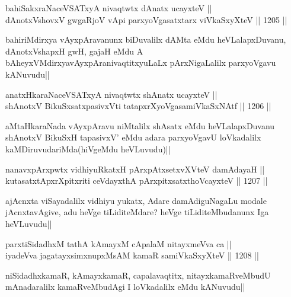 
\begin{shl}
bahiSakxraNaceVSATxyA nivaqtwtx dAnatx ucayxteV || \\
dAnotxV\s shovxV gwgaRjoV vA\s pi parxyoVgasatxtarx viVkaSxyXteV ||  1205 ||  
\end{shl}

\begin{artha}
bahiriMdirxya vAyxpAravanunx biDuvalilx dAMta eMdu heVLalapxDuvanu, dAnotxV\s shapxH gwH, gajaH eMdu A bAheyxVMdirxyavAyxpAranivaqtitxyuLaLx pArxNigaLalilx parxyoVgavu kANuvudu||
\end{artha}


\begin{shl}
anatxHkaraNaceVSATxyA nivaqtwtx shAnatx ucayxteV || \\
shAnotxV BikuSxsatxpasivxVti tatapxrXyoVgasamiVkaSxNAtf ||  1206 ||  
\end{shl}

\begin{artha}
aMtaHkaraNada vAyxpAravu niMtalilx shAsatx eMdu heVLalapxDuvanu shAnotxV BikuSxH tapasivxV' eMdu adara parxyoVgavU loVkadalilx kaMDiruvudariMda(hiVgeMdu heVLuvudu)||
\end{artha}


\begin{shl}
nanavxpArxpwtx vidhiyuRkatxH pArxpAtxsetxvXVteV damAdayaH || \\
kutasatxtApxrXpitxriti ceVdayxthA pArxpitxsatxthoVcayxteV ||  1207 ||  
\end{shl}

\begin{artha}
ajAcnxta viSayadalilx vidhiyu yukatx, Adare damAdiguNagaLu modale jAcnxtavAgive, adu heVge tiLiditeMdare? heVge tiLiditeMbudanunx Iga heVLuvudu||
\end{artha}

\begin{shl}
parxtiSidadhxM tathA kAmayxM cApalaM nitayxmeVva ca || \\
iyadeVva jagatayxsimxnupxMsAM kamaR samiVkaSxyXteV ||  1208 ||  
\end{shl}

\begin{artha}
niSidadhxkamaR, kAmayxkamaR, capalavaqtitx, nitayxkamaRveMbudU mAnadaralilx kamaRveMbudAgi I loVkadalilx eMdu kANuvudu||
\end{artha}

